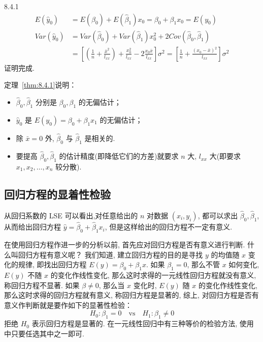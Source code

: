 \begin{theorem}{}{8.4.1}
\begin{equation*}
  \begin{split}
  E(\hat{y}_{0}) &= E(\hat{\beta}_{0}) + E(\hat{\beta}_{1}) x_{0} = \beta_{0} + \beta_{1} x_{0} = E(y_{0}) \\ 
  Var(\hat{y}_{0}) &= Var(\hat{\beta}_{0}) + Var(\hat{\beta}_{1}) x_{0}^{2} + 2 Cov(\hat{\beta}_{0}, \hat{\beta}_{1}) \\
  & = \left[\left(\frac{1}{n}+\frac{\bar{x}^{2}}{l_{x x}}\right)+\frac{x_{0}^{2}}{l_{x x}}-2 \frac{x_{0} \bar{x}}{l_{x x}}\right] \sigma^{2}=\left[\frac{1}{n}+\frac{\left(x_{0}-\bar{x}\right)^{2}}{l_{x x}}\right]\sigma^{2}
  \end{split}
\end{equation*}
证明完成.
\end{theorem}

定理~\ref{thm:8.4.1}说明：
\begin{itemize}
  \item  $\hat{\beta}_0, \hat{\beta}_1$ 分别是  $\beta_0, \beta_1$ 的无偏估计；
  \item  $\hat{y}_0$ 是 $E(y_0) =\beta_0 + \beta_1 x_1$ 的无偏估计；
  \item 除 $\bar{x}=0$ 外, $\hat{\beta}_0$ 与 $\hat{\beta}_1$ 是相关的.
  \item 要提高 $\hat{\beta}_0, \hat{\beta}_1$ 的估计精度(即降低它们的方差)就要求 $n$ 大, $l_{xx}$ 大(即要求 $x_1, x_2, \ldots, x_n$ 较分散).
\end{itemize}
\subsection{回归方程的显着性检验}\label{ssec:8.4.4}

从回归系数的 LSE 可以看出,对任意给出的 $n$ 对数据 $(x_i, y_i)$, 都可以求出 $\hat{\beta}_0, \hat{\beta}_1$, 从而给出回归方程 $\hat{y} = \hat{\beta }_0 + \hat{\beta }_1 x_{i}$, 但是这样给出的回归方程不一定有意义.

在使用回归方程作进一步的分析以前, 首先应对回归方程是否有意义进行判断. 什么叫回归方程有意义呢？ 我们知道, 建立回归方程的目的是寻找 $y $ 的均值随 $x$ 变化的规律, 即找出回归方程 $E(y) = \beta _0 + \beta _1 x$. 如果 $\beta_1 = 0$, 那么不管 $x$ 如何变化, $E(y)$ 不随 $x$  的变化作线性变化, 那么这时求得的一元线性回归方程就没有意义, 称回归方程不显著. 如果 $\beta \neq 0$, 那么当 $x$ 变化时, $E(y)$ 随 $x$ 的变化作线性变化, 那么这时求得的回归方程就有意义, 称回归方程是显著的, 综上, 对回归方程是否有意义作判断就是要作如下的显著性检验：
\begin{equation*}
H_0:\beta_1=0 \quad \text{vs} \quad H_1:\beta_1 \neq 0
\end{equation*}
拒绝 $H_0$ 表示回归方程是显著的. 在一元线性回归中有三种等价的检验方法, 使用中只要任选其中之一即可.

